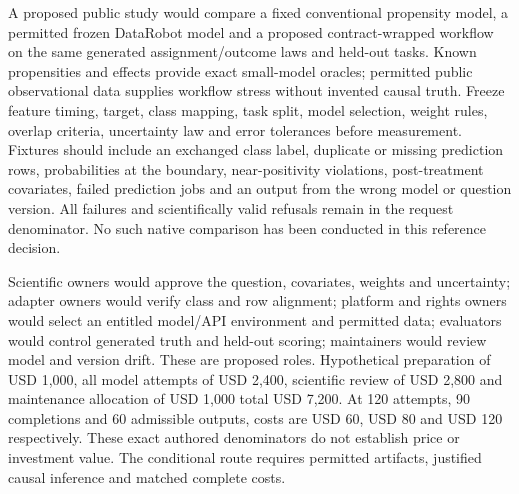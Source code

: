A proposed public study would compare a fixed conventional propensity model,
a permitted frozen DataRobot model and a proposed contract-wrapped workflow on
the same generated assignment/outcome laws and held-out tasks. Known
propensities and effects provide exact small-model oracles; permitted public
observational data supplies workflow stress without invented causal truth.
Freeze feature timing, target, class mapping, task split, model selection,
weight rules, overlap criteria, uncertainty law and error tolerances before
measurement. Fixtures should include an exchanged class label, duplicate or
missing prediction rows, probabilities at the boundary, near-positivity
violations, post-treatment covariates, failed prediction jobs and an output
from the wrong model or question version. All failures and scientifically
valid refusals remain in the request denominator. No such native comparison
has been conducted in this reference decision.\citep{exec25_datarobot_choice}

Scientific owners would approve the question, covariates, weights and
uncertainty; adapter owners would verify class and row alignment; platform and
rights owners would select an entitled model/API environment and permitted
data; evaluators would control generated truth and held-out scoring;
maintainers would review model and version drift. These are proposed roles.
Hypothetical preparation of USD 1,000, all model attempts of USD 2,400,
scientific review of USD 2,800 and maintenance allocation of USD 1,000 total
USD 7,200. At 120 attempts, 90 completions and 60 admissible outputs, costs are
USD 60, USD 80 and USD 120 respectively. These exact authored denominators do
not establish price or investment value. The conditional route requires
permitted artifacts, justified causal inference and matched complete costs.
\citep{exec25_datarobot_choice}
